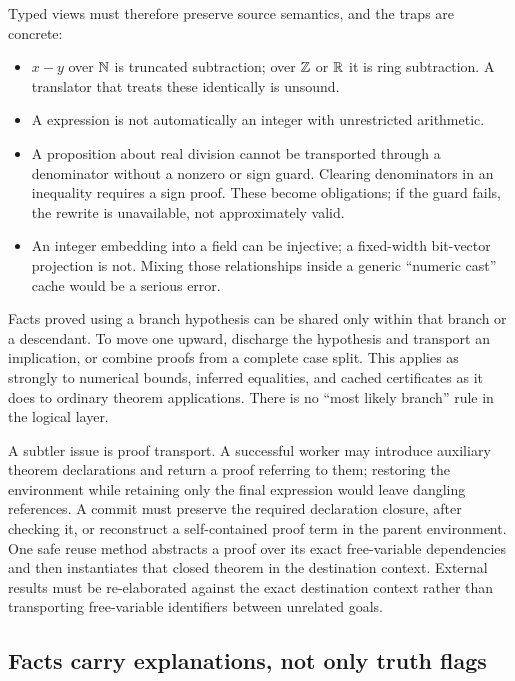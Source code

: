 Typed views must therefore preserve source semantics, and the traps are
concrete:

\begin{itemize}[leftmargin=1.4em]
\item $x-y$ over $\mathbb{N}$ is truncated subtraction; over $\mathbb{Z}$ or $\mathbb{R}$ it is ring
  subtraction. A translator that treats these identically is unsound.
\item A  expression is not automatically an integer with
  unrestricted arithmetic.
\item A proposition about real division cannot be transported through a
  denominator without a nonzero or sign guard. Clearing denominators in an
  inequality requires a sign proof. These become 
  obligations; if the guard fails, the rewrite is unavailable, not
  approximately valid.
\item An integer embedding into a field can be injective; a fixed-width
  bit-vector projection is not. Mixing those relationships inside a generic
  ``numeric cast'' cache would be a serious error.
\end{itemize}

Facts proved using a branch hypothesis can be shared only within that branch or
a descendant. To move one upward, discharge the hypothesis and transport an
implication, or combine proofs from a complete case split. This applies as
strongly to numerical bounds, inferred equalities, and cached certificates as
it does to ordinary theorem applications. There is no ``most likely branch''
rule in the logical layer.

A subtler issue is proof transport. A successful worker may introduce auxiliary
theorem declarations and return a proof referring to them; restoring the
environment while retaining only the final expression would leave dangling
references. A commit must preserve the required declaration closure, after
checking it, or reconstruct a self-contained proof term in the parent
environment. One safe reuse method abstracts a proof over its exact
free-variable dependencies and then instantiates that closed theorem in the
destination context. External results must be re-elaborated against the exact
destination context rather than transporting free-variable identifiers between
unrelated goals.

\subsection{Facts carry explanations, not only truth flags}

